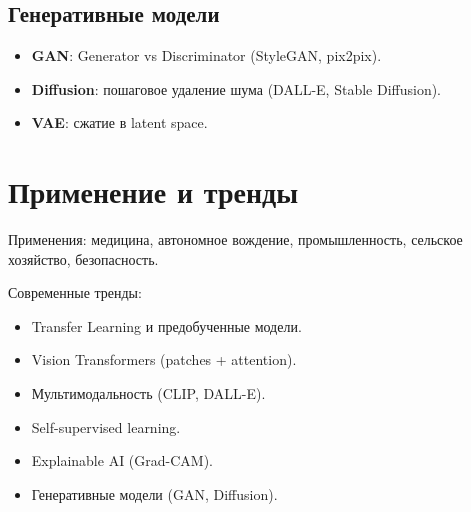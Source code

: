 \documentclass[a4paper,12pt]{article}
\begin{document}
\subsection{Генеративные модели}
\begin{itemize}
    \item \textbf{GAN}: Generator vs Discriminator (StyleGAN, pix2pix).
    \item \textbf{Diffusion}: пошаговое удаление шума (DALL-E, Stable Diffusion).
    \item \textbf{VAE}: сжатие в latent space.
\end{itemize}

\section{Применение и тренды}

Применения: медицина, автономное вождение, промышленность, сельское хозяйство, безопасность.

Современные тренды:
\begin{itemize}
    \item Transfer Learning и предобученные модели.
    \item Vision Transformers (patches + attention).
    \item Мультимодальность (CLIP, DALL-E).
    \item Self-supervised learning.
    \item Explainable AI (Grad-CAM).
    \item Генеративные модели (GAN, Diffusion).
\end{itemize}
\end{document}
